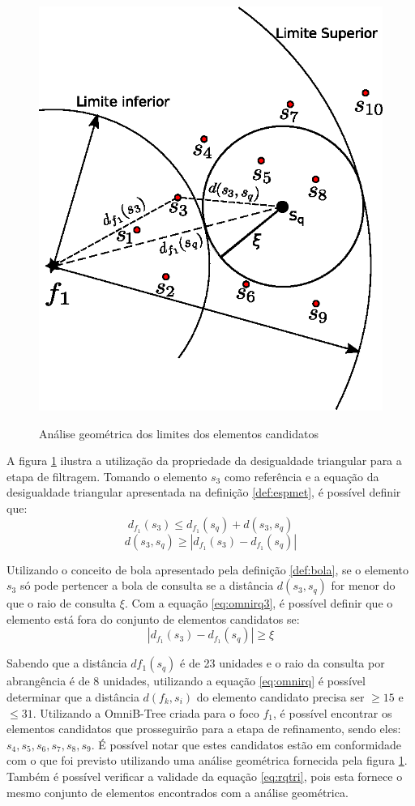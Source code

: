 \begin{figure}[H]
\centering
\caption{Análise geométrica dos limites dos elementos candidatos}
\includegraphics[width=.55\textwidth]{dados/figuras/rg_ex2.eps}
\label{fig:rgex2}
\end{figure}
A figura \ref{fig:rgex2} ilustra a utilização da propriedade da desigualdade triangular para a etapa de filtragem. Tomando o elemento $s_3$ como referência e a equação da desigualdade triangular apresentada
na definição \ref{def:espmet}, é possível definir que:
\begin{equation} \label{eq:omnirq2}
d_{f_1}(s_3) \leq d_{f_1}(s_q) + d(s_3, s_q)
\end{equation}
\begin{equation} \label{eq:omnirq3}
d(s_3, s_q) \geq |d_{f_1}(s_3) - d_{f_1}(s_q)|
\end{equation}\par
Utilizando o conceito de bola apresentado pela definição \ref{def:bola}, se o elemento $s_3$ só pode pertencer a bola de consulta se a distância
$d(s_3, s_q)$ for menor do que o raio de consulta $\xi$. Com a equação \ref{eq:omnirq3}, é possível definir que o elemento está fora do conjunto
de elementos candidatos se:
\begin{equation} \label{eq:rqtri}
 |d_{f_1}(s_3) - d_{f_1}(s_q)| \geq \xi
\end{equation}\par
Sabendo que a distância $df_1(s_q)$ é de 23 unidades e o raio da consulta por abrangência é de 8 unidades, utilizando a equação \ref{eq:omnirq} é possível determinar que a distância $d(f_k, s_i)$ do elemento candidato precisa ser $\geq 15$ e $\leq 31$.
Utilizando a OmniB-Tree criada para o foco $f_1$, é possível encontrar os elementos candidatos que prosseguirão para a etapa de refinamento, sendo eles: $s_4, s_5, s_6, s_7, s_8, s_9$. É possível notar que estes candidatos estão em conformidade com o que
foi previsto utilizando uma análise geométrica fornecida pela figura \ref{fig:rgex2}. Também é possível verificar a validade da equação
\ref{eq:rqtri}, pois esta fornece o mesmo conjunto de elementos encontrados com a análise geométrica.
